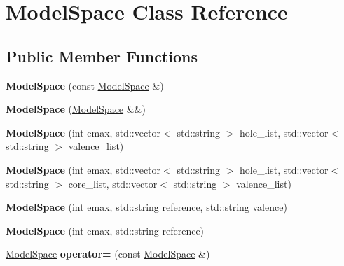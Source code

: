 \hypertarget{classModelSpace}{\section{Model\-Space Class Reference}
\label{classModelSpace}
}
\subsection*{Public Member Functions}
\begin{DoxyCompactItemize}
\item 
\hypertarget{classModelSpace_a9554b9bc74b82e392fafc9de496fce5f}{{\bfseries Model\-Space} (const \hyperlink{classModelSpace}{Model\-Space} \&)}\label{classModelSpace_a9554b9bc74b82e392fafc9de496fce5f}

\item 
\hypertarget{classModelSpace_a6fe287e59b9aca7719a553f7dedcd2d7}{{\bfseries Model\-Space} (\hyperlink{classModelSpace}{Model\-Space} \&\&)}\label{classModelSpace_a6fe287e59b9aca7719a553f7dedcd2d7}

\item 
\hypertarget{classModelSpace_a48d732fa9364d473f55d1ad0c1b5da60}{{\bfseries Model\-Space} (int emax, std\-::vector$<$ std\-::string $>$ hole\-\_\-list, std\-::vector$<$ std\-::string $>$ valence\-\_\-list)}\label{classModelSpace_a48d732fa9364d473f55d1ad0c1b5da60}

\item 
\hypertarget{classModelSpace_a8a66fe8539ab34bc1addf2703fbf627e}{{\bfseries Model\-Space} (int emax, std\-::vector$<$ std\-::string $>$ hole\-\_\-list, std\-::vector$<$ std\-::string $>$ core\-\_\-list, std\-::vector$<$ std\-::string $>$ valence\-\_\-list)}\label{classModelSpace_a8a66fe8539ab34bc1addf2703fbf627e}

\item 
\hypertarget{classModelSpace_ab095c4be09ac5d7c109b0bf103fe529a}{{\bfseries Model\-Space} (int emax, std\-::string reference, std\-::string valence)}\label{classModelSpace_ab095c4be09ac5d7c109b0bf103fe529a}

\item 
\hypertarget{classModelSpace_adb7d0069158164e7b6597a155eee4253}{{\bfseries Model\-Space} (int emax, std\-::string reference)}\label{classModelSpace_adb7d0069158164e7b6597a155eee4253}

\item 
\hypertarget{classModelSpace_a2b01062b499979b919b7b77b04745cbe}{\hyperlink{classModelSpace}{Model\-Space} {\bfseries operator=} (const \hyperlink{classModelSpace}{Model\-Space} \&)}\label{classModelSpace_a2b01062b499979b919b7b77b04745cbe}


\end{DoxyCompactItemize}
